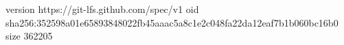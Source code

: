 version https://git-lfs.github.com/spec/v1
oid sha256:352598a01e65893848022fb45aaac5a8c1e2c048fa22da12eaf7b1b060bc16b0
size 362205
